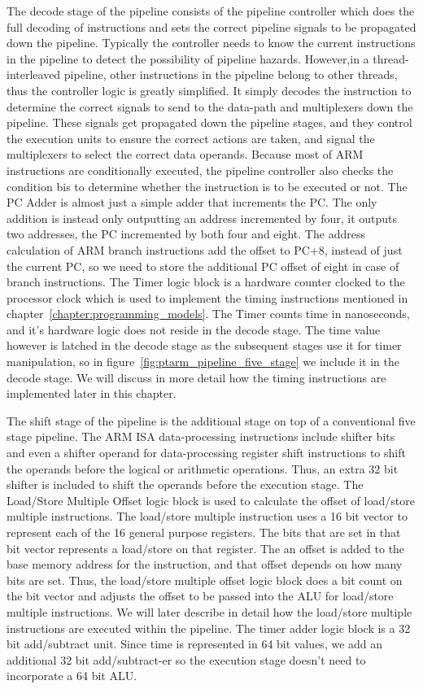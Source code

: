 The decode stage of the pipeline consists of the pipeline controller which does the full decoding of instructions and sets the correct pipeline signals to be propagated down the pipeline. 
Typically the controller needs to know the current instructions in the pipeline to detect the possibility of pipeline hazards.
However,in a thread-interleaved pipeline, other instructions in the pipeline belong to other threads, thus the controller logic is greatly simplified. 
It simply decodes the instruction to determine the correct signals to send to the data-path and multiplexers down the pipeline. 
These signals get propagated down the pipeline stages, and they control the execution units to ensure the correct actions are taken, and signal the multiplexers to select the correct data operands.  
Because most of ARM instructions are conditionally executed, the pipeline controller also checks the condition bis to determine whether the instruction is to be executed or not.  
The PC Adder is almost just a simple adder that increments the PC. 
The only addition is instead only outputting an address incremented by four, it outputs two addresses, the PC incremented by both four and eight. 
The address calculation of ARM branch instructions add the offset to PC+8, instead of just the current PC, so we need to store the additional PC offset of eight in case of branch instructions.
The Timer logic block is a hardware counter clocked to the processor clock which is used to implement the timing instructions mentioned in chapter~\ref{chapter:programming_models}.
The Timer counts time in nanoseconds, and it's hardware logic does not reside in the decode stage. 
The time value however is latched in the decode stage as the subsequent stages use it for timer manipulation, so in figure~\ref{fig:ptarm_pipeline_five_stage} we include it in the decode stage.
We will discuss in more detail how the timing instructions are implemented later in this chapter. 

The shift stage of the pipeline is the additional stage on top of a conventional five stage pipeline. 
The ARM ISA data-processing instructions include shifter bits and even a shifter operand for data-processing register shift instructions to shift the operands before the logical or arithmetic operations.
Thus, an extra 32 bit shifter is included to shift the operands before the execution stage. 
The Load/Store Multiple Offset logic block is used to calculate the offset of load/store multiple instructions.
The load/store multiple instruction uses a 16 bit vector to represent each of the 16 general purpose registers.
The bits that are set in that bit vector represents a load/store on that register.
The an offset is added to the base memory address for the instruction, and that offset depends on how many bits are set. 
Thus, the load/store multiple offset logic block does a bit count on the bit vector and adjusts the offset to be passed into the ALU for load/store multiple instructions.
We will later describe in detail how the load/store multiple instructions are executed within the pipeline.
The timer adder logic block is a 32 bit add/subtract unit. 
Since time is represented in 64 bit values, we add an additional 32 bit add/subtract-er so the execution stage doesn't need to incorporate a 64 bit ALU.

